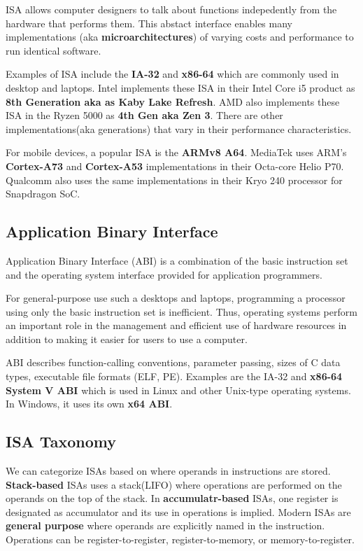 \documentclass[a4paper, 11pt,oneside]{article}
\begin{document}
ISA allows computer designers to talk about functions indepedently from the 
hardware that performs them. This abstact interface enables many 
implementations (aka \textbf{microarchitectures}) of varying costs and 
performance to run identical software.

Examples of ISA include the \textbf{IA-32} and \textbf{x86-64} which are 
commonly used in desktop and laptops. Intel implements these ISA in their Intel 
Core i5 product as \textbf{8th Generation aka as Kaby Lake Refresh}. AMD also 
implements these ISA in the Ryzen 5000 as \textbf{4th Gen aka Zen 3}. There are 
other implementations(aka generations) that vary in their performance 
characteristics.

For mobile devices, a popular ISA is the \textbf{ARMv8 A64}. MediaTek uses 
ARM's \textbf{Cortex-A73} and \textbf{Cortex-A53} implementations in their 
Octa-core Helio P70. Qualcomm also uses the same implementations in their Kryo 
240 processor for Snapdragon SoC.

\subsection{Application Binary Interface}
Application Binary Interface (ABI) is a combination of the basic instruction 
set and the operating system interface provided for application programmers. 

For general-purpose use such a desktops and laptops, programming a processor 
using only the basic instruction set is inefficient. Thus, operating systems 
perform an important role in the management and efficient use of hardware 
resources in addition to making it easier for users to use a computer. 

ABI describes function-calling conventions, parameter passing, sizes of 
C data types, executable file formats (ELF, PE). Examples are the IA-32 and 
\textbf{x86-64 System V ABI} which is used in Linux and other Unix-type 
operating systems. In Windows, it uses its own \textbf{x64 ABI}.

\subsection{ISA Taxonomy}
We can categorize ISAs based on where operands in instructions are stored.
\textbf{Stack-based} ISAs uses a stack(LIFO) where operations are performed on 
the operands on the top of the stack. In \textbf{accumulatr-based} ISAs, one 
register is designated as accumulator and its use in operations is implied. 
Modern ISAs are \textbf{general purpose} where operands are explicitly named in 
the instruction. Operations can be register-to-register, register-to-memory, 
or memory-to-register.
\end{document}
